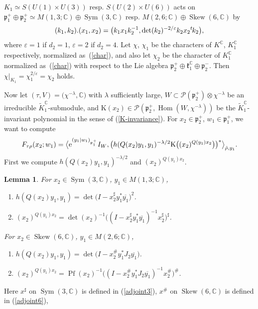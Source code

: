 \documentclass[pdftex]{sigma}
\numberwithin{equation}{section}
\newtheorem{Lemma}[Theorem]{Lemma}
\newcommand{\BC}{\mathbb{C}}
\newcommand{\fk}{\mathfrak{k}}
\newcommand{\fp}{\mathfrak{p}}
\newcommand{\cP}{\mathcal{P}}
\newcommand{\rK}{\mathrm{K}}
\newcommand{\Hom}{\operatorname{Hom}}
\newcommand{\Pf}{\operatorname{Pf}}
\newcommand{\Sym}{\operatorname{Sym}}
\newcommand{\Skew}{\operatorname{Skew}}
\begin{document}
$K_1\simeq S(U(1)\times U(3))$ resp. $S(U(2)\times U(6))$ acts on $\fp^+_1\oplus\fp^+_2\simeq M(1,3;\BC)\oplus \Sym(3,\BC)$ resp.
$M(2,6;\BC)\oplus\Skew(6,\BC)$ by
\begin{gather*} (k_1,k_2).(x_1,x_2)=\big(k_1x_1k_2^{-1},\det(k_2)^{-2/\varepsilon}k_2x_2{}^t\hspace{-1pt}k_2\big), \end{gather*}
where $\varepsilon=1$ if $d_2=1$, $\varepsilon=2$ if $d_2=4$.
Let $\chi$, $\chi_1$ be the characters of $K^\BC$, $K_1^\BC$ respectively, normalized as~(\ref{char}),
and also let $\chi_2$ be the character of $K_1^\BC$ normalized as~(\ref{char}) with respect to the
Lie algebra $\fp^+_2\oplus\fk_1^\BC\oplus\fp^-_2$. Then $\chi|_{K_1}=\chi_1^{2/\varepsilon}=\chi_2$ holds.

Now let $(\tau,V)=\big(\chi^{-\lambda},\BC\big)$ with $\lambda$ sufficiently large,
$W\subset\cP(\fp^+_2)\otimes\chi^{-\lambda}$ be an irreducible $\tilde{K}^\BC_1$-submodule,
and $\rK(x_2)\in \cP(\fp^+_2,\Hom(W,\chi^{-\lambda}))$ be the $\tilde{K}^\BC_1$-invariant polynomial in the sense of (\ref{K-invariance}).
For $x_2\in\fp^+_2$, $w_1\in\fp^+_1$, we want to compute
\begin{gather*}
F_{\tau\rho}(x_2;w_1)
=\big\langle {\rm e}^{(y_1|w_1)_{\fp^+_1}}I_W,
\big(h(Q(x_2)y_1,y_1)^{-\lambda/2}\rK\big((x_2)^{Q(y_1)x_2}\big)\big)^*\big\rangle_{\hat{\rho},y_1}.
\end{gather*}
First we compute $h(Q(x_2)y_1,y_1)^{-\lambda/2}$ and $(x_2)^{Q(y_1)x_2}$.
\begin{Lemma}
For $x_2\in\Sym(3,\BC)$, $y_1\in M(1,3;\BC)$,
\begin{enumerate}\itemsep=0pt
\item[$(1)$] $h(Q(x_2)y_1,y_1)=\det\big(I-x_2^\sharp y_1^*\overline{y_1}\big)^2$.
\item[$(2)$] $(x_2)^{Q(y_1)x_2}=\det(x_2)^{-1}\big((I-x_2^\sharp y_1^*\overline{y_1})^{-1}x_2^\sharp \big)^\sharp$.
\end{enumerate}
For $x_2\in\Skew(6,\BC)$, $y_1\in M(2,6;\BC)$,
\begin{enumerate}\itemsep=0pt
\item[$(3)$] $h(Q(x_2)y_1,y_1)=\det\big(I-x_2^\#y_1^*J_2\overline{y_1}\big)$.
\item[$(4)$] $(x_2)^{Q(y_1)x_2}=\Pf(x_2)^{-1}\big((I-x_2^\#y_1^*J_2\overline{y_1})^{-1}x_2^\#\big)^\#$.
\end{enumerate}
\end{Lemma}
Here $x^\sharp$ on $\Sym(3,\BC)$ is defined in (\ref{adjoint3}), $x^\#$ on $\Skew(6,\BC)$ is defined in (\ref{adjoint6}),
\end{document}
